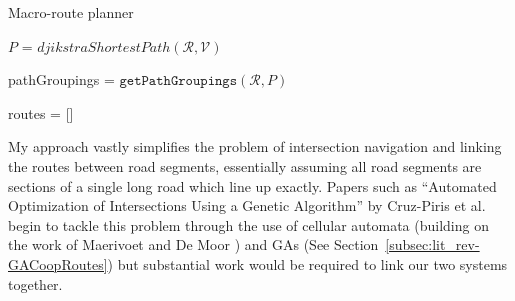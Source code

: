 \begin{algorithm}
  \caption{Macro-route planner}\label{alg:mrp}

  $P$ = $djikstraShortestPath(\mathcal{R},\mathcal{V})$

  pathGroupings = $\texttt{getPathGroupings}(\mathcal{R}, P)$

  routes = [] 



\end{algorithm}


My approach vastly simplifies the problem of intersection navigation and linking the routes between road segments, essentially assuming all road segments are sections of a single long road which line up exactly. Papers such as ``Automated Optimization of Intersections Using a Genetic Algorithm'' by Cruz-Piris et al.\cite{cruz-pirisAutomatedOptimizationIntersections2019} begin to tackle this problem through the use of cellular automata (building on the work of Maerivoet and De Moor\cite{maerivoetCellularAutomataModels2005}
) and GAs (See Section~\ref{subsec:lit_rev-GACoopRoutes}) but substantial work would be required to link our two systems together.



